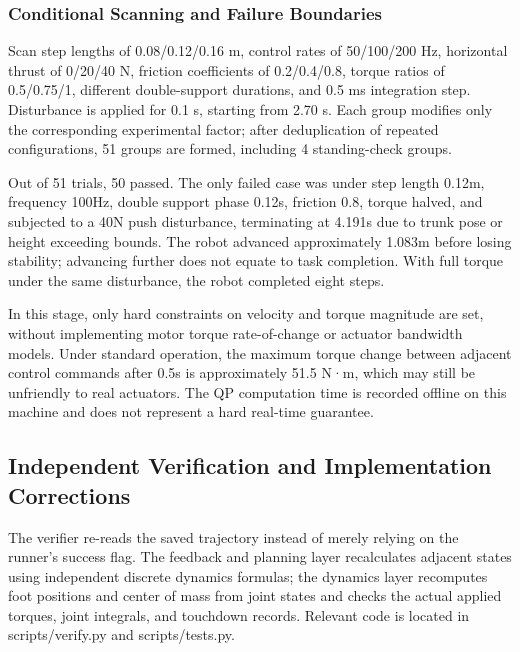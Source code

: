 \subsubsection{Conditional Scanning and Failure Boundaries}\label{s21-detail-4}

Scan step lengths of 0.08/0.12/0.16 m, control rates of 50/100/200 Hz, horizontal thrust of 0/20/40 N, friction coefficients of 0.2/0.4/0.8, torque ratios of 0.5/0.75/1, different double-support durations, and 0.5 ms integration step. Disturbance is applied for 0.1 s, starting from 2.70 s. Each group modifies only the corresponding experimental factor; after deduplication of repeated configurations, 51 groups are formed, including 4 standing-check groups.


Out of 51 trials, 50 passed. The only failed case was under step length 0.12m, frequency 100Hz, double support phase 0.12s, friction 0.8, torque halved, and subjected to a 40N push disturbance, terminating at 4.191s due to trunk pose or height exceeding bounds. The robot advanced approximately 1.083m before losing stability; advancing further does not equate to task completion. With full torque under the same disturbance, the robot completed eight steps.


In this stage, only hard constraints on velocity and torque magnitude are set, without implementing motor torque rate-of-change or actuator bandwidth models. Under standard operation, the maximum torque change between adjacent control commands after 0.5s is approximately 51.5 N·m, which may still be unfriendly to real actuators. The QP computation time is recorded offline on this machine and does not represent a hard real-time guarantee.

\subsection{Independent Verification and Implementation Corrections}\label{s21-detail-5}

The verifier re-reads the saved trajectory instead of merely relying on the runner's success flag. The feedback and planning layer recalculates adjacent states using independent discrete dynamics formulas; the dynamics layer recomputes foot positions and center of mass from joint states and checks the actual applied torques, joint integrals, and touchdown records. Relevant code is located in scripts/verify.py and scripts/tests.py.

